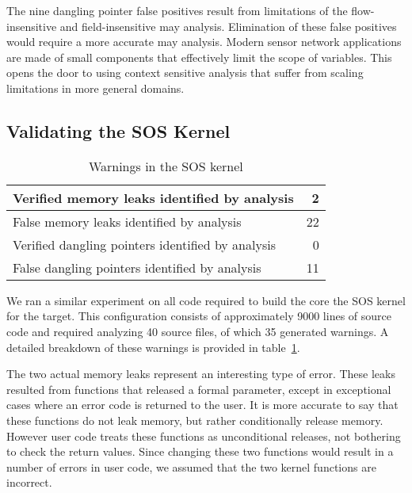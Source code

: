 \smallskip{}

The nine dangling pointer false positives result from limitations of
the flow-insensitive and field-insensitive may analysis.  Elimination
of these false positives would require a more accurate may analysis.
Modern sensor network applications are made of small components that
effectively limit the scope of variables.  This opens the door to using
context sensitive analysis that suffer from scaling limitations in
more general domains.


\subsection{Validating the SOS Kernel}

\begin{table}
\caption{Warnings in the SOS kernel}
%
\label{tab:kernel}
\centering 
\begin{tabular}{| l | r |}
    \hline 
    Verified memory leaks identified by analysis & 2 \\
    \hline
    False memory leaks identified by analysis & 22 \\
    \hline 
    Verified dangling pointers identified by analysis & 0 \\
    \hline 
    False dangling pointers identified by analysis & 11 \\
    \hline 
\end{tabular} 
%
\end{table}


We ran a similar experiment on all code required to build the core the
SOS kernel for the  target.  This configuration consists
of approximately 9000 lines of source code and required analyzing 40
source files, of which 35 generated warnings.  A detailed breakdown of
these warnings is provided in table~\ref{tab:kernel}.

%
The two actual memory leaks represent an interesting type of error.
These leaks resulted from functions that released a formal parameter,
except in exceptional cases where an error code is returned to the
user.  It is more accurate to say that these functions do not leak
memory, but rather conditionally release memory.  However user code
treats these functions as unconditional releases, not bothering to
check the return values.  Since changing these two functions would
result in a number of errors in user code, we assumed that the two
kernel functions are incorrect.


